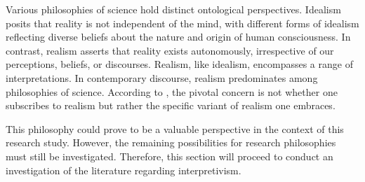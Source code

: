 {\par{Various philosophies of science hold distinct ontological perspectives. Idealism posits that reality is not independent of the mind, with different forms of idealism reflecting diverse beliefs about the nature and origin of human consciousness. In contrast, realism asserts that reality exists autonomously, irrespective of our perceptions, beliefs, or discourses. Realism, like idealism, encompasses a range of interpretations. In contemporary discourse, realism predominates among philosophies of science. According to \cite{bhaskar2013realist}, the pivotal concern is not whether one subscribes to realism but rather the specific variant of realism one embraces.}
\par{This philosophy could prove to be a valuable perspective in the context of this research study. However, the remaining possibilities for research philosophies must still be investigated. Therefore, this section will proceed to conduct an investigation of the literature regarding interpretivism.}
}
